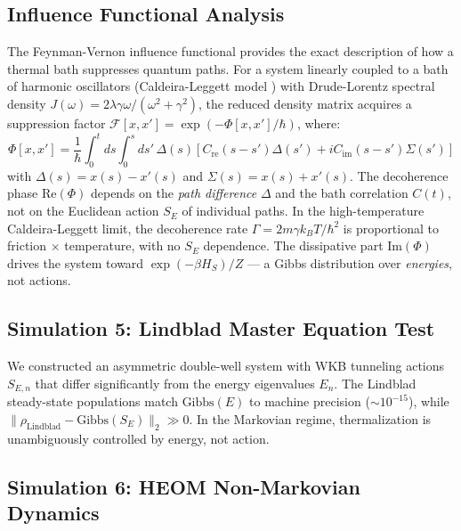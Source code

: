 \documentclass[aps,prl,twocolumn,superscriptaddress,longbibliography]{revtex4-2}
\begin{document}
\subsection{Influence Functional Analysis}

The Feynman-Vernon influence functional \cite{FeynmanVernon1963} provides the exact description of how a thermal bath suppresses quantum paths. For a system linearly coupled to a bath of harmonic oscillators (Caldeira-Leggett model \cite{CaldeiraLeggett1983}) with Drude-Lorentz spectral density $J(\omega) = 2\lambda\gamma\omega/(\omega^2 + \gamma^2)$, the reduced density matrix acquires a suppression factor $\mathcal{F}[x,x'] = \exp(-\Phi[x,x']/\hbar)$, where:
\begin{equation}
    \Phi[x,x'] = \frac{1}{\hbar}\int_0^t\!\!ds\int_0^s\!\!ds'\,\Delta(s)\!\left[C_{\mathrm{re}}(s\!-\!s')\Delta(s') + iC_{\mathrm{im}}(s\!-\!s')\Sigma(s')\right]
    \label{eq:influence}
\end{equation}
with $\Delta(s) = x(s) - x'(s)$ and $\Sigma(s) = x(s) + x'(s)$. The decoherence phase Re$(\Phi)$ depends on the \emph{path difference} $\Delta$ and the bath correlation $C(t)$, not on the Euclidean action $S_E$ of individual paths. In the high-temperature Caldeira-Leggett limit, the decoherence rate $\Gamma = 2m\gamma k_BT/\hbar^2$ is proportional to friction $\times$ temperature, with no $S_E$ dependence. The dissipative part Im$(\Phi)$ drives the system toward $\exp(-\beta H_S)/Z$ --- a Gibbs distribution over \emph{energies}, not actions.

\subsection{Simulation 5: Lindblad Master Equation Test}

We constructed an asymmetric double-well system with WKB tunneling actions $S_{E,n}$ that differ significantly from the energy eigenvalues $E_n$. The Lindblad steady-state populations match $\text{Gibbs}(E)$ to machine precision ($\sim 10^{-15}$), while $\|\rho_{\text{Lindblad}} - \text{Gibbs}(S_E)\|_2 \gg 0$. In the Markovian regime, thermalization is unambiguously controlled by energy, not action.

\subsection{Simulation 6: HEOM Non-Markovian Dynamics}
\end{document}
